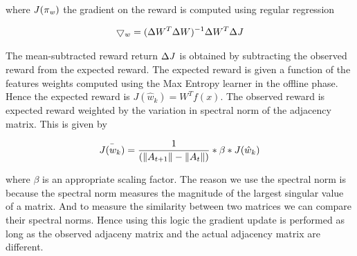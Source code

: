 where ${\it J(\pi_w)}$ the gradient on the reward is computed using regular regression

\[
\bigtriangledown_w = (\Delta W^T\Delta W)^{-1}\Delta W^T\Delta {\it J}\\
\]

The mean-subtracted reward return $\Delta {\it J}$ is obtained by subtracting the observed reward from the expected reward. The expected reward is given a function of the features weights computed using the Max Entropy learner in the offline phase. Hence the expected reward is $J(\hat{w}_k) = W^Tf(x)$. The observed reward is expected reward weighted by the variation in spectral norm of the adjacency matrix. This is given by

\[
\bar{J(w_k)} = \frac{1}{(\|A_{t+1}\| - \|A_t\|)}*\beta*J(\hat{w}_k)\\
\]

where $\beta$ is an appropriate scaling factor. The reason we use the spectral norm is because the spectral norm measures the magnitude of the largest singular value of a matrix. And to measure the similarity between two matrices we can compare their spectral norms. Hence using this logic the gradient update is performed as long as the observed adjaceny matrix and the actual adjacency matrix are different.

